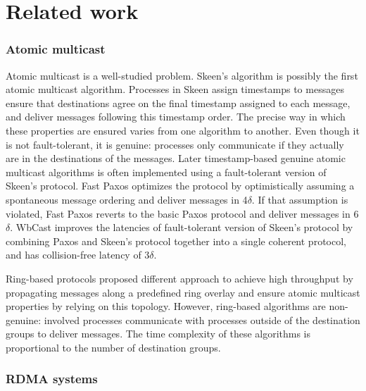 \section{Related work}
\label{sec:related-work}

\subsubsection*{Atomic multicast}
Atomic multicast is a well-studied problem. Skeen’s algorithm
\cite{birman1987reliable} is possibly the first atomic multicast algorithm.
Processes in Skeen assign timestamps to messages ensure that destinations agree
on the final timestamp assigned to each message, and deliver messages following
this timestamp order. The precise way in which these properties are ensured
varies from one algorithm to another. Even though it is not fault-tolerant, it
is genuine: processes only communicate if they actually are in the destinations
of the messages. Later timestamp-based genuine atomic multicast algorithms is
often implemented using a fault-tolerant version of Skeen’s protocol. Fast Paxos
\cite{coelho2017fast} optimizes the protocol by optimistically assuming a
spontaneous message ordering and deliver messages in 4$\delta$. If that
assumption is violated, Fast Paxos reverts to the basic Paxos protocol and
deliver messages in 6$\delta$. WbCast \cite{gotsman2019white} improves the
latencies of fault-tolerant version of Skeen's protocol by combining Paxos and
Skeen’s protocol together into a single coherent protocol, and has
collision-free latency of 3$\delta$.

Ring-based protocols \cite{delporte2000fault, bezerra2015ridge,
marandi2012multi} proposed different approach to achieve high throughput by
propagating messages along a predefined ring overlay and ensure atomic multicast
properties by relying on this topology. However, ring-based algorithms are
non-genuine: involved processes communicate with processes outside of the
destination groups to deliver messages. The time complexity of these algorithms is
proportional to the number of destination groups.

\subsubsection*{RDMA systems}

